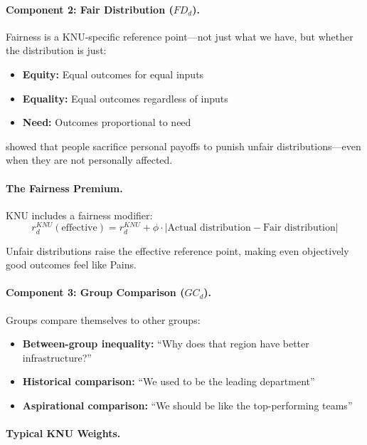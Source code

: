 \paragraph{Component 2: Fair Distribution ($FD_d$).}
Fairness is a KNU-specific reference point---not just what we have, but 
whether the distribution is just:

\begin{itemize}
\item \textbf{Equity:} Equal outcomes for equal inputs
\item \textbf{Equality:} Equal outcomes regardless of inputs
\item \textbf{Need:} Outcomes proportional to need
\end{itemize}

\citet{fehr1999theory} showed that people sacrifice personal payoffs to 
punish unfair distributions---even when they are not personally affected.

\paragraph{The Fairness Premium.}
KNU includes a fairness modifier:
\begin{equation}
r^{KNU}_d(\text{effective}) = r^{KNU}_d + \phi \cdot |\text{Actual distribution} - \text{Fair distribution}|
\end{equation}

Unfair distributions raise the effective reference point, making even 
objectively good outcomes feel like Pains.

\paragraph{Component 3: Group Comparison ($GC_d$).}
Groups compare themselves to other groups:

\begin{itemize}
\item \textbf{Between-group inequality:} ``Why does that region have better infrastructure?''
\item \textbf{Historical comparison:} ``We used to be the leading department''
\item \textbf{Aspirational comparison:} ``We should be like the top-performing teams''
\end{itemize}

\paragraph{Typical KNU Weights.}

